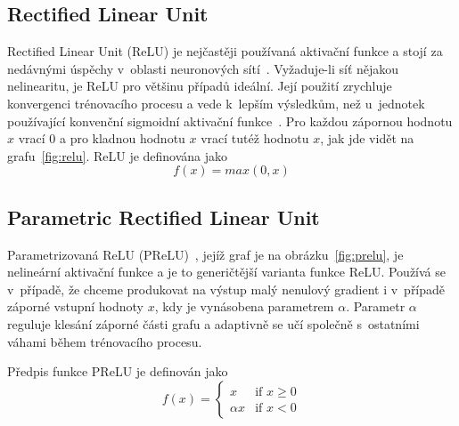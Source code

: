 \subsection*{Rectified Linear Unit}
\label{relu}
Rectified Linear Unit (ReLU) je nejčastěji používaná aktivační funkce a stojí za nedávnými úspěchy v~oblasti neuronových sítí~\cite{NIPS2012_4824}. Vyžaduje-li síť nějakou nelinearitu, je ReLU pro většinu případů ideální. Její použití zrychluje konvergenci trénovacího procesu a vede k~lepším výsledkům, než u~jednotek používající konvenční sigmoidní aktivační funkce~\cite{40811}. Pro každou zápornou hodnotu $x$ vrací $0$ a pro kladnou hodnotu $x$ vrací tutéž hodnotu $x$, jak jde vidět na grafu~\ref{fig:relu}. ReLU je definována jako 
\begin{equation}
   f(x)=max(0,x)
\end{equation}




\subsection*{Parametric Rectified Linear Unit}
Parametrizovaná ReLU (PReLU)~\cite{he2015delving}, jejíž graf je na obrázku~\ref{fig:prelu}, je nelineární aktivační funkce a je to generičtější varianta funkce ReLU. Používá se v~případě, že chceme produkovat na výstup malý nenulový gradient i v~případě záporné vstupní hodnoty $x$, kdy je vynásobena parametrem $\alpha$. Parametr $\alpha$ reguluje klesání záporné části grafu a adaptivně se učí společně s~ostatními váhami během trénovacího procesu.

Předpis funkce PReLU je definován jako
\begin{equation}
  f(x) =
  \begin{cases}
    x & \text{if } x \geq 0 \\
    {\alpha}x & \text{if } x < 0
  \end{cases}
\end{equation}


